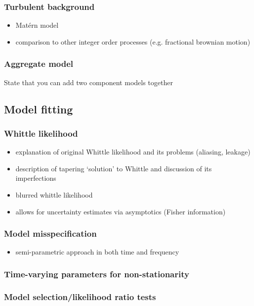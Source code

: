 \documentclass{stat572Style}
\begin{document}
		\subsubsection{Turbulent background}
				\begin{itemize}
					\item Mat\'{e}rn model 
					\item comparison to other integer order processes (e.g. fractional brownian motion)
				\end{itemize}
		
		\subsubsection{Aggregate model}
			State that you can add two component models together
	
	\subsection{Model fitting}
		\subsubsection{Whittle likelihood}
				
			\begin{itemize}
				\item explanation of original Whittle likelihood and its problems (aliasing, leakage)
				\item description of tapering `solution' to Whittle and discussion of its imperfections
				\item blurred whittle likelihood 
				\item allows for uncertainty estimates via asymptotics (Fisher information)
			\end{itemize}
	
		\subsubsection{Model misspecification}
			\begin{itemize}
				\item semi-parametric approach in both time and frequency
			\end{itemize}
		\subsubsection{Time-varying parameters for non-stationarity}
		
		\subsubsection{Model selection/likelihood ratio tests}
	
\end{document}
